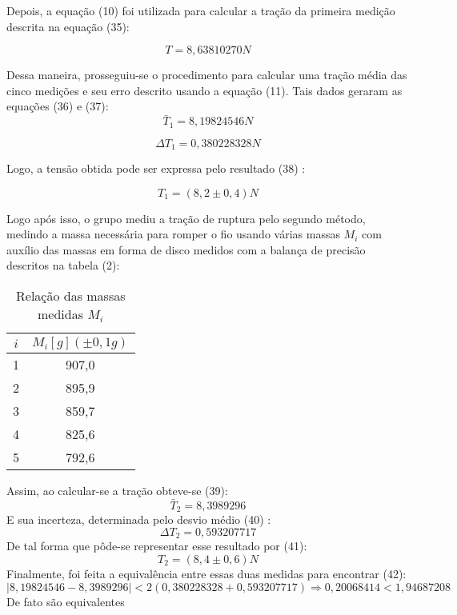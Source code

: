 \documentclass[12pt, letterpaper]{article}
\begin{document}
Depois, a equação (10) foi utilizada para calcular a tração da primeira medição descrita na equação (35):

\begin{equation}
    T= 8,63810270 N
\end{equation}

Dessa maneira, prosseguiu-se o procedimento para calcular uma tração média das cinco medições e seu erro descrito usando a equação (11). Tais dados geraram as equações (36) e (37): 
\begin{equation}
   \bar T_1 = 8,19824546 N
\end{equation}

\begin{equation}
    \Delta T_1 = 0,380228328 N
\end{equation}

Logo, a tensão obtida pode ser expressa pelo resultado (38) :

\begin{equation}
    T_1 = (8,2 \pm 0,4) N
\end{equation}

Logo após isso, o grupo mediu a tração de ruptura pelo segundo método, medindo a massa necessária para romper o fio usando várias massas $M_{i}$ com auxílio das massas em forma de disco medidos com a balança de precisão descritos na tabela (2):

\begin{table}[!h]
 \centering
        \caption{Relação das massas medidas $M_{i}$}
         \begin{tabular}{| c | c |}
           \hline
             $i$  & $M_{i}[g](\pm0,1g)$  \\
            \hline
               1   &  907,0  \\
           \hline    
            2   &   895,9  \\
           \hline    
            3   &   859,7  \\
           \hline    
               4   &  825,6 \\
           \hline    
               5  & 792,6  \\
        
             
             \hline 
        \end{tabular} 
        \label{tab:2}

\end{table}

Assim, ao calcular-se a tração obteve-se (39):
\begin{equation}
    \bar T_2 = 8,3989296 
\end{equation}
E sua incerteza, determinada pelo desvio médio (40) :
\begin{equation}
    \Delta T_2 = 0,593207717
\end{equation}
De tal forma que pôde-se representar esse resultado por (41):
\begin{equation}
    T_2 = (8,4 \pm 0,6) N
\end{equation}
Finalmente, foi feita a equivalência entre essas duas medidas para encontrar (42):
\begin{equation}
|8,19824546 - 8,3989296| < 2(0,380228328 + 0,593207717)  \Rightarrow
0,20068414 < 1,94687208
\end{equation}
De fato são equivalentes
\end{document}
